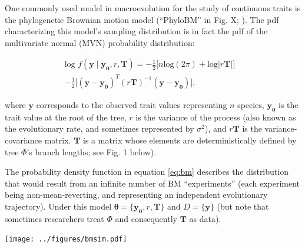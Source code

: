 \documentclass[oneside]{article}
\begin{document}
\begin{tcolorbox}[breakable, width=\textwidth, colback=gray!10, boxrule=0pt,
  title=Box 1: Models characterized by well-known parametric distributions, fonttitle=\bfseries]
  \small 
  One commonly used model in macroevolution for the study
of continuous traits is the phylogenetic Brownian motion model (``PhyloBM'' in Fig. X;
\citealt{felsenstein73}).
The pdf characterizing this model's sampling distribution is in fact
the pdf of the multivariate normal (MVN) probability distribution:

\begin{equation}
  \begin{split}
    \text{log }f(\mathbf{y} \mid \boldsymbol{y_0}, r, \boldsymbol{T}) = -\frac{1}{2} \Big[ n\text{log}(2\pi) + \text{log}|r \boldsymbol{T}| \Big] & \\
    -\frac{1}{2} \Big[ (\mathbf{y} - \boldsymbol{y_0})^T (r \boldsymbol{T})^{-1} (\mathbf{y} - \boldsymbol{y_0}) \Big],
  \label{eq:bm}
  \end{split}
\end{equation}

\noindent where $\mathbf{y}$ corresponds to the observed trait values representing
$n$ species, $\boldsymbol{y_0}$ is the trait value at the root of the tree, $r$ is the variance
of the process (also known as the evolutionary rate, and sometimes represented by
$\sigma^2$), and $r\boldsymbol{T}$ is the variance-covariance matrix.
$\boldsymbol{T}$ is a matrix whose elements are deterministically defined by tree
$\Phi$'s branch lengths; see Fig. 1 below).

\vspace{.25cm}
The probability density function in equation \eqref{eq:bm} describes the distribution
that would result from an infinite number of BM ``experiments'' (each experiment
being non-mean-reverting, and representing an independent evolutionary trajectory).
Under this model $\boldsymbol{\theta} = \{\boldsymbol{y_0}, r, \boldsymbol{T}\}$ and $D = \{\mathbf{y}\}$
(but note that sometimes researchers treat $\Phi$ and consequently $\boldsymbol{T}$ as
data).

\begin{center}
\texttt{[image: ../figures/bmsim.pdf]}
\label{fig:bmsim}
\end{center}


\end{tcolorbox}
\end{document}
